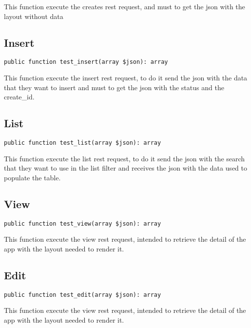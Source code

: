 \documentclass[a4paper]{book}
\begin{document}
This function execute the creates rest request, and must to get the
json with the layout without data

\hypertarget{toc71}{}
\subsection{Insert}

\begin{lstlisting}
public function test_insert(array $json): array
\end{lstlisting}

This function execute the insert rest request, to do it send the json with
the data that they want to insert and must to get the json with the status
and the create\_id.

\hypertarget{toc72}{}
\subsection{List}

\begin{lstlisting}
public function test_list(array $json): array
\end{lstlisting}

This function execute the list rest request, to do it send the json with
the search that they want to use in the list filter and receives the json
with the data used to populate the table.

\hypertarget{toc73}{}
\subsection{View}

\begin{lstlisting}
public function test_view(array $json): array
\end{lstlisting}

This function execute the view rest request, intended to retrieve the detail
of the app with the layout needed to render it.

\hypertarget{toc74}{}
\subsection{Edit}

\begin{lstlisting}
public function test_edit(array $json): array
\end{lstlisting}

This function execute the view rest request, intended to retrieve the detail
of the app with the layout needed to render it.
\end{document}
